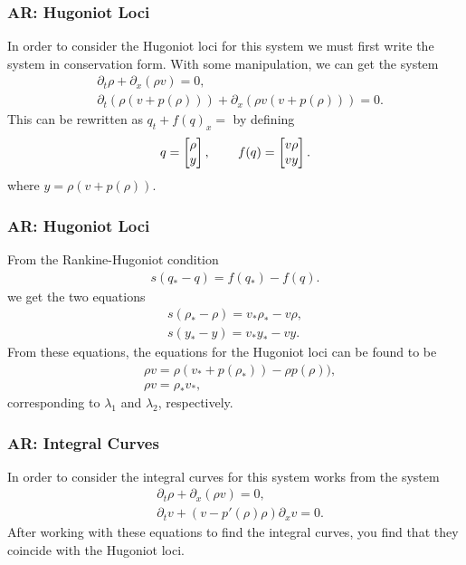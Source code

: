 \documentclass{beamer}
\begin{document}


\begin{frame}
\frametitle{AR: Hugoniot Loci}
In order to consider the Hugoniot loci for this system we must first write the system in conservation form. 
With some manipulation, we can get the system
\begin{align*}
&\partial_t\rho + \partial_x(\rho v) = 0, \\
&\partial_t \left(\rho\left(v + p(\rho )\right)\right) + \partial_x \left( \rho v\left(v + p(\rho )\right)\right) = 0.
\end{align*}
This can be rewritten as $q_t + f(q)_x = $ by defining
\begin{align*}
q = \left[ \begin{matrix}
\rho \\ y
\end{matrix}\right], \hspace{0.3in}
f(q) = \left[ \begin{matrix}
v\rho \\
vy
\end{matrix}\right].
\end{align*}
where $y = \rho\left(v + p(\rho )\right)$.
\end{frame}

\begin{frame}
\frametitle{AR: Hugoniot Loci}
From the Rankine-Hugoniot condition
\begin{align*}
s(q_*- q) = f(q_*) - f(q).
\end{align*}
we get the two equations
\begin{align*}
s(\rho_* - \rho) = v_*\rho_* - v\rho,\\
s(y_* - y) = v_*y_* - vy.
\end{align*}
From these equations, the equations for the Hugoniot loci can be found to be
\begin{align*}
&\rho v = \rho \left( v_* + p(\rho_*)\right) - \rho p(\rho)),\\
&\rho v = \rho_* v_*,
\end{align*}
corresponding to $\lambda_1$ and $\lambda_2$, respectively.
\end{frame}

\begin{frame}
\frametitle{AR: Integral Curves}
In order to consider the integral curves for this system \cite{AwRascle2000} 
works from the system
\begin{align*}
&\partial_t \rho + \partial_x (\rho v) = 0, \\ 
&\partial_t v + \left(v - p'(\rho)\rho\right)\partial_x v = 0.
\end{align*}
After working with these equations to find the integral curves, you find that they coincide with the Hugoniot loci.
\end{frame}
\end{document}
